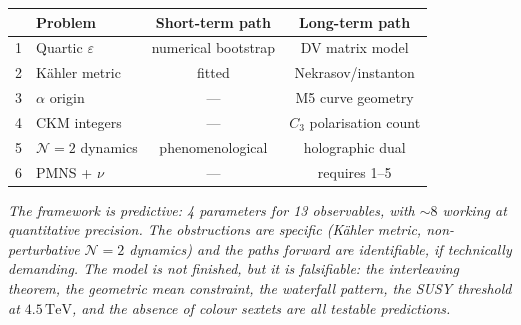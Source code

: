 \documentclass[12pt,a4paper]{article}
\newcommand{\TeV}{\,\mathrm{TeV}}
\begin{document}
\bigskip

\begin{center}
\begin{tabular}{clcc}
  \toprule
  & Problem & Short-term path & Long-term path \\
  \midrule
  1 & Quartic $\varepsilon$ & numerical bootstrap & DV matrix model \\
  2 & K\"ahler metric & fitted & Nekrasov/instanton \\
  3 & $\alpha$ origin & --- & M5 curve geometry \\
  4 & CKM integers & --- & $C_3$ polarisation count \\
  5 & $\mathcal{N}{=}2$ dynamics & phenomenological & holographic dual \\
  6 & PMNS + $\nu$ & --- & requires 1--5 \\
  \bottomrule
\end{tabular}
\end{center}

\bigskip

\noindent\textit{The framework is predictive: 4 parameters for 13 observables,
with $\sim 8$ working at quantitative precision.  The obstructions are
specific (K\"ahler metric, non-perturbative $\mathcal{N}{=}2$ dynamics)
and the paths forward are identifiable, if technically demanding.
The model is not finished, but it is falsifiable: the interleaving theorem,
the geometric mean constraint, the waterfall pattern, the SUSY threshold
at $4.5\TeV$, and the absence of colour sextets are all testable predictions.}
\end{document}
